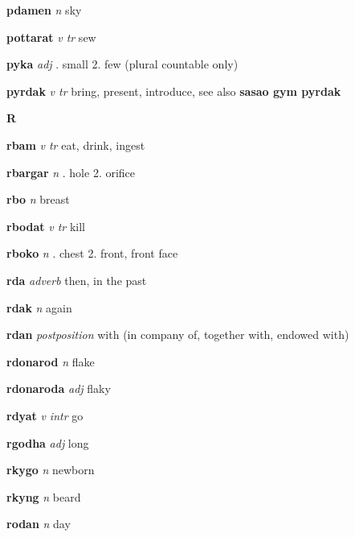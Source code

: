\textbf{pdamen}   \emph{n} \textperiodcentered sky

\textbf{pottarat}   \emph{v tr} \textperiodcentered sew

\textbf{pyka}   \emph{adj} . small 2. few (plural countable only) 

\textbf{pyrdak}   \emph{v tr} \textperiodcentered bring, present, introduce, see also \textbf{sasao gym pyrdak}

\begin{center} \Huge \bfseries R \end{center}\textbf{rbam}   \emph{v tr} \textperiodcentered eat, drink, ingest

\textbf{rbargar}   \emph{n} . hole 2. orifice 

\textbf{rbo}   \emph{n} \textperiodcentered breast

\textbf{rbodat}   \emph{v tr} \textperiodcentered kill

\textbf{rboko}   \emph{n} . chest 2. front, front face 

\textbf{rda}   \emph{adverb} \textperiodcentered then, in the past

\textbf{rdak}   \emph{n} \textperiodcentered again

\textbf{rdan}   \emph{postposition} \textperiodcentered with (in company of, together with, endowed with)

\textbf{rdonarod}   \emph{n} \textperiodcentered flake

\textbf{rdonaroda}   \emph{adj} \textperiodcentered flaky

\textbf{rdyat}   \emph{v intr} \textperiodcentered go

\textbf{rgodha}   \emph{adj} \textperiodcentered long

\textbf{rkygo}   \emph{n} \textperiodcentered newborn

\textbf{rkyng}   \emph{n} \textperiodcentered beard

\textbf{rodan}   \emph{n} \textperiodcentered day

